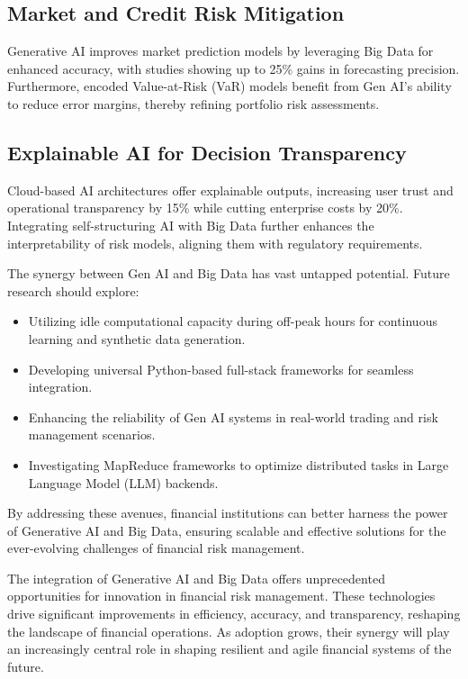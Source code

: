 \documentclass[a4paper,headinclude=on,footinclude=on,12pt,oneside]{scrbook}
\begin{document}
	
	\subsection{Market and Credit Risk Mitigation}
	Generative AI improves market prediction models by leveraging Big Data for enhanced accuracy, with studies showing up to 25\% gains in forecasting precision. Furthermore, encoded Value-at-Risk (VaR) models benefit from Gen AI’s ability to reduce error margins, thereby refining portfolio risk assessments.
	
	\subsection{Explainable AI for Decision Transparency}
	Cloud-based AI architectures offer explainable outputs, increasing user trust and operational transparency by 15\% while cutting enterprise costs by 20\%. Integrating self-structuring AI with Big Data further enhances the interpretability of risk models, aligning them with regulatory requirements.
	
	The synergy between Gen AI and Big Data has vast untapped potential. Future research should explore:
	\begin{itemize}
		\item Utilizing idle computational capacity during off-peak hours for continuous learning and synthetic data generation.
		\item Developing universal Python-based full-stack frameworks for seamless integration.
		\item Enhancing the reliability of Gen AI systems in real-world trading and risk management scenarios.
		\item Investigating MapReduce frameworks to optimize distributed tasks in Large Language Model (LLM) backends.
	\end{itemize}
	
	By addressing these avenues, financial institutions can better harness the power of Generative AI and Big Data, ensuring scalable and effective solutions for the ever-evolving challenges of financial risk management.
	
	The integration of Generative AI and Big Data offers unprecedented opportunities for innovation in financial risk management. These technologies drive significant improvements in efficiency, accuracy, and transparency, reshaping the landscape of financial operations. As adoption grows, their synergy will play an increasingly central role in shaping resilient and agile financial systems of the future.
	
\end{document}
